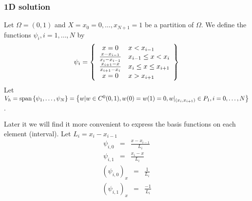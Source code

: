 \documentclass[10pt,dvips,twoside,reqno]{amsart}
\begin{document}
\subsubsection{1D solution}

Let $\Omega = (0,1)$ and $X={x_0=0,\ldots,x_{N+1}=1}$ be a partition of
$\Omega$. We define the functions $\psi_{i},i=1,\ldots,N$ by
\begin{equation}
\psi_i = \left\{ \begin{array}{cl} 
x = 0 & x < x_{i-1} \\
\frac{x - x_{i-1}}{x_{i} - x_{i-1}} & x_{i-1} \leq x < x_i \\
\frac{x_{i+1} - x}{x_{i+1} - x_{i}} & x_{i} \leq x \leq x_{i+1} \\
x = 0 & x > x_{i+1} 
\end{array} \right\}
\end{equation}
Let $V_h = \mbox{span}\left\{ \psi_1,\ldots,\psi_N \right\} = \left\{ w |
w \in C^0(0,1),w(0)=w(1)=0,w|_{(x_i,x_{i+1})} \in P_1,i=0,\ldots,N \right\}$.

Later it we will find it more convenient to express the basis functions on each element (interval). Let $L_i=x_i-x_{i-1}$
\begin{eqnarray}
\psi_{i,0} &=& \frac{x - x_{i-1}}{L_i} \\
\psi_{i,1} &=& \frac{x_i - x}{L_i} 
\end{eqnarray}
\begin{eqnarray}
(\psi_{i,0})_x &=& \frac{1}{L_i} \\
(\psi_{i,1})_x &=& \frac{-1}{L_i} 
\end{eqnarray}
\end{document}
